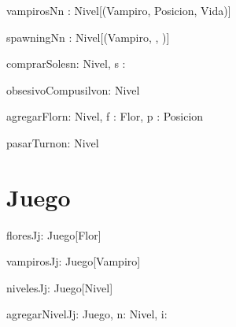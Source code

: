 \documentclass[spanish,a4paper]{article}
\begin{document}
\begin{problema}{vampirosN}{n : Nivel}{[(Vampiro, Posicion, Vida)]}
\end{problema}

\begin{problema}{spawningN}{n : Nivel}{[(Vampiro, \ent, \ent)]}
\end{problema}

\begin{problema}{comprarSoles}{n: Nivel, s : \ent}{}
\end{problema}

\begin{problema}{obsesivoCompusilvo}{n: Nivel}{\bool}
\end{problema}

\begin{problema}{agregarFlor}{n: Nivel, f : Flor, p : Posicion}{}
\end{problema}

\noindent{}

\begin{problema}{pasarTurno}{n: Nivel}{}
\end{problema}




\section{Juego}


\begin{problema}{floresJ}{j: Juego}{[Flor]}
\end{problema}

\begin{problema}{vampirosJ}{j: Juego}{[Vampiro]}
\end{problema}

\begin{problema}{nivelesJ}{j: Juego}{[Nivel]}
\end{problema}

\begin{problema}{agregarNivelJ}{j: Juego, n: Nivel, i: \ent}{}
	\asegura {(\forall k \leftarrow [0..i)) niveles(j)_k == niveles(pre(j))_k}
\end{problema}
\end{document}
